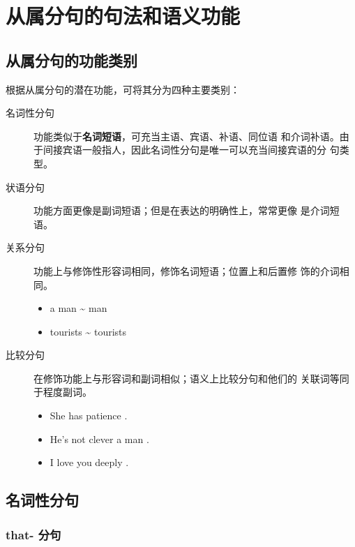 \section{从属分句的句法和语义功能}

\subsection{从属分句的功能类别}

根据从属分句的潜在功能，可将其分为四种主要类别：
\begin{description}
\item[名词性分句] 功能类似于\textbf{名词短语}，可充当主语、宾语、补语、同位语
  和介词补语。由于间接宾语一般指人，因此名词性分句是唯一可以充当间接宾语的分
  句类型。

\item[状语分句] 功能方面更像是副词短语；但是在表达的明确性上，常常更像
  是介词短语。

\item[关系分句] 功能上与修饰性形容词相同，修饰名词短语；位置上和后置修
  饰的介词相同。
  \begin{itemize}
  \item a man  \~{}  man
  \item tourists  \~{} tourists 
  \end{itemize}

\item[比较分句] 在修饰功能上与形容词和副词相似；语义上比较分句和他们的
  关联词等同于程度副词。
  \begin{itemize}
  \item She has  patience .
  \item He's not  clever a man .
  \item I love you  deeply .
  \end{itemize}
\end{description}

\subsection{名词性分句}

\subsubsection{that- 分句}
\label{subsubsec:thatclause}

